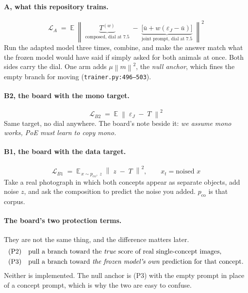 \documentclass[11pt]{article}
\newcommand{\eps}{\varepsilon}
\newcommand{\xt}{x_t}
\newcommand{\E}{\mathbb{E}}
\newcommand{\norm}[1]{\left\lVert #1 \right\rVert}
\begin{document}
\paragraph{A, what this repository trains.}
\begin{equation}
  \boxed{\;
  \mathcal{L}_A \;=\; \E\;\norm{\;
  \underbrace{T^{(w)}}_{\text{composed, dial at }7.5}
  \;-\;
  \underbrace{\big[\bar u + w(\eps_J - \bar u)\big]}_{\text{joint prompt, dial at }7.5}
  \;}^2
  \;}
  \label{eq:LA}
\end{equation}
Run the adapted model three times, combine, and make the answer match what the frozen model would
have said if simply asked for both animals at once. Both sides carry the dial. One arm adds
$\mu\norm{m}^2$, the \emph{null anchor}, which fines the empty branch for moving
(\texttt{trainer.py:496--503}).

\paragraph{B2, the board with the mono target.}
\begin{equation}
  \boxed{\;
  \mathcal{L}_{B2} \;=\; \E\;\norm{\;\eps_J \;-\; T\;}^2
  \;}
  \label{eq:LB2}
\end{equation}
Same target, no dial anywhere. The board's note beside it: \emph{we assume mono works, PoE must
learn to copy mono.}

\paragraph{B1, the board with the data target.}
\begin{equation}
  \boxed{\;
  \mathcal{L}_{B1} \;=\; \E_{\,x \sim p_{\mathrm{co}},\; z}\;\norm{\;z \;-\; T\;}^2 ,
  \qquad \xt = \text{noised } x
  \;}
  \label{eq:LB1}
\end{equation}
Take a real photograph in which both concepts appear as separate objects, add noise $z$, and ask the
composition to predict the noise you added. $p_{\mathrm{co}}$ is that corpus.

\paragraph{The board's two protection terms.}
They are not the same thing, and the difference matters later.
\begin{align}
  \text{(P2)}\quad &\text{pull a branch toward the \emph{true} score of real single-concept images,}
  \label{eq:P2}\\
  \text{(P3)}\quad &\text{pull a branch toward \emph{the frozen model's own} prediction for that
  concept.}
  \label{eq:P3}
\end{align}
Neither is implemented. The null anchor is (P3) with the empty prompt in place of a concept prompt,
which is why the two are easy to confuse.
\end{document}
